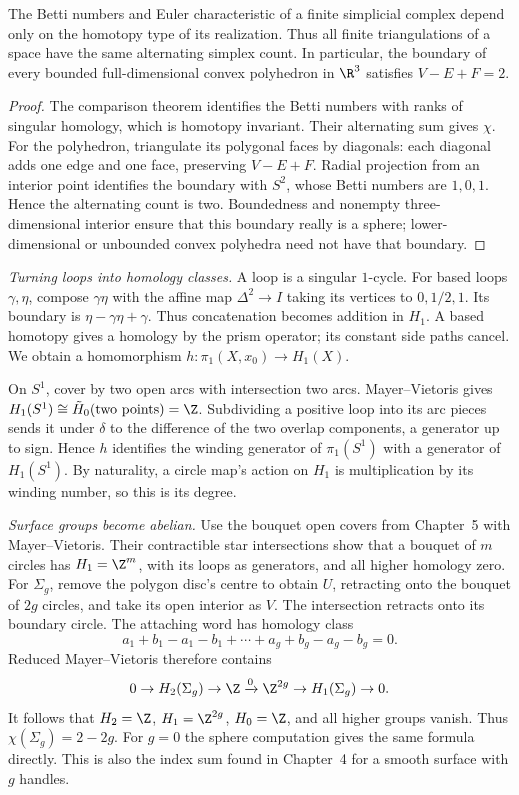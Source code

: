 \begin{corollary}\label{cor:euler}
The Betti numbers and Euler characteristic of a finite simplicial complex depend only on the homotopy type of its realization. Thus all finite triangulations of a space have the same alternating simplex count. In particular, the boundary of every bounded full-dimensional convex polyhedron in $\R^3$ satisfies $V-E+F=2$.
\end{corollary}

\begin{proof}
The comparison theorem identifies the Betti numbers with ranks of singular homology, which is homotopy invariant. Their alternating sum gives $\chi$. For the polyhedron, triangulate its polygonal faces by diagonals: each diagonal adds one edge and one face, preserving $V-E+F$. Radial projection from an interior point identifies the boundary with $S^2$, whose Betti numbers are $1,0,1$. Hence the alternating count is two. Boundedness and nonempty three-dimensional interior ensure that this boundary really is a sphere; lower-dimensional or unbounded convex polyhedra need not have that boundary.
\end{proof}

\begin{example}\label{ex:surfacesH}
\emph{Turning loops into homology classes.} A loop is a singular $1$-cycle. For based loops $\gamma,\eta$, compose $\gamma\eta$ with the affine map $\Delta^2\to I$ taking its vertices to $0,1/2,1$. Its boundary is $\eta-\gamma\eta+\gamma$. Thus concatenation becomes addition in $H_1$. A based homotopy gives a homology by the prism operator; its constant side paths cancel. We obtain a homomorphism $h:\pi_1(X,x_0)\to H_1(X)$.

On $S^1$, cover by two open arcs with intersection two arcs. Mayer--Vietoris gives $H_1(S^1)\cong\tilde H_0(\text{two points})=\Z$. Subdividing a positive loop into its arc pieces sends it under $\delta$ to the difference of the two overlap components, a generator up to sign. Hence $h$ identifies the winding generator of $\pi_1(S^1)$ with a generator of $H_1(S^1)$. By naturality, a circle map's action on $H_1$ is multiplication by its winding number, so this is its degree.

\emph{Surface groups become abelian.} Use the bouquet open covers from Chapter~5 with Mayer--Vietoris. Their contractible star intersections show that a bouquet of $m$ circles has $H_1=\Z^m$, with its loops as generators, and all higher homology zero. For $\Sigma_g$, remove the polygon disc's centre to obtain $U$, retracting onto the bouquet of $2g$ circles, and take its open interior as $V$. The intersection retracts onto its boundary circle. The attaching word has homology class
\[
a_1+b_1-a_1-b_1+\cdots+a_g+b_g-a_g-b_g=0.
\]
Reduced Mayer--Vietoris therefore contains
\[
0\to H_2(\Sigma_g)\to\Z\xrightarrow{0}\Z^{2g}
\to H_1(\Sigma_g)\to0.
\]
It follows that $H_2=\Z$, $H_1=\Z^{2g}$, $H_0=\Z$, and all higher groups vanish. Thus $\chi(\Sigma_g)=2-2g$. For $g=0$ the sphere computation gives the same formula directly. This is also the index sum found in Chapter~4 for a smooth surface with $g$ handles.
\end{example}


